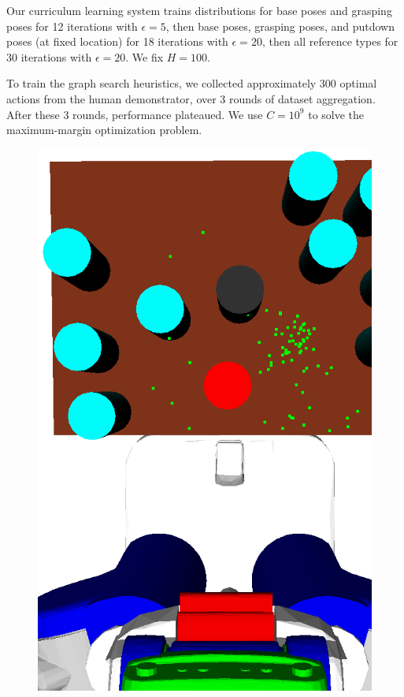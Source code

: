Our curriculum learning system trains distributions for base poses and
grasping poses for 12 iterations with $\epsilon = 5$, then base poses,
grasping poses, and putdown poses (at fixed location) for 18
iterations with $\epsilon = 20$, then all reference types for 30
iterations with $\epsilon = 20$. We fix $H = 100$.

To train the graph search heuristics, we collected approximately 300
optimal actions from the human demonstrator, over 3 rounds of dataset aggregation.
After these 3 rounds, performance plateaued. We use $C =
10^{9}$ to solve the maximum-margin optimization problem.

\begin{figure}[t]
  \centering
    \noindent
    \includegraphics[scale=0.13]{images/grasp_context_1.png}

\end{figure}
